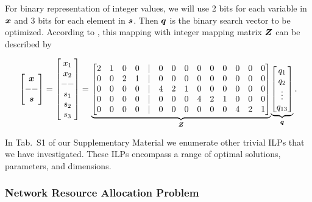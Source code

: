 \documentclass[utf8, nocrop]{FrontiersinHarvardArxiv}
\def\ve#1{\mathlette{\boldmath}{#1}}
\def\mathlette#1#2{{\mathchoice{\mbox{#1$\displaystyle #2$}}%
        {\mbox{#1$\textstyle #2$}}%
        {\mbox{#1$\scriptstyle #2$}}%
        {\mbox{#1$\scriptscriptstyle #2$}}}}
\begin{document}
For binary representation of integer values, we will use 2 bits for each variable in $\ve x$ and 3 bits for each element in $\ve s$. Then $\ve q$ is the binary search vector to be optimized. According to \cite{Chang:2020iwh}, this mapping with integer mapping matrix $\ve Z$ can be described by

\begin{equation}
\setcounter{MaxMatrixCols}{15}
\begin{bmatrix}
    \ve x\\--\\
    \ve s\\
\end{bmatrix}
=
\begin{bmatrix}
    x_1\\x_2\\--\\s_1\\s_2\\s_3
\end{bmatrix}
=   
\underset{\ve Z}{\underbrace{
    \begin{bmatrix}
        2&1&0&0&|&0&0&0&0&0&0&0&0&0\\
        0&0&2&1&|&0&0&0&0&0&0&0&0&0\\
        0&0&0&0&|&4&2&1&0&0&0&0&0&0\\
        0&0&0&0&|&0&0&0&4&2&1&0&0&0\\
        0&0&0&0&|&0&0&0&0&0&0&4&2&1\\
    \end{bmatrix}
}}
\underset{\ve q}{\underbrace{
\begin{bmatrix}
q_1\\q_2\\\vdots\\q_{13}
\end{bmatrix}}}\,.
\end{equation}

In Tab.~S1 of our Supplementary Material we enumerate other trivial ILPs that we have investigated.  These ILPs encompass a range of optimal solutions, parameters, and dimensions.

\subsubsection{Network Resource Allocation Problem}
\end{document}
